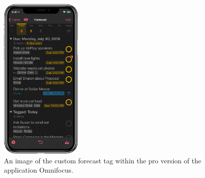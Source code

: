 \begin{figure}[htb]

	\centering
	\includegraphics[width=4cm]{./graphics/omnifocus3.png}
	\caption{An image of the custom forecast tag within the pro version of the application Omnifocus\cite{OmniFocus}.}
	\label{fig:omnifocus3}
	
\end{figure}